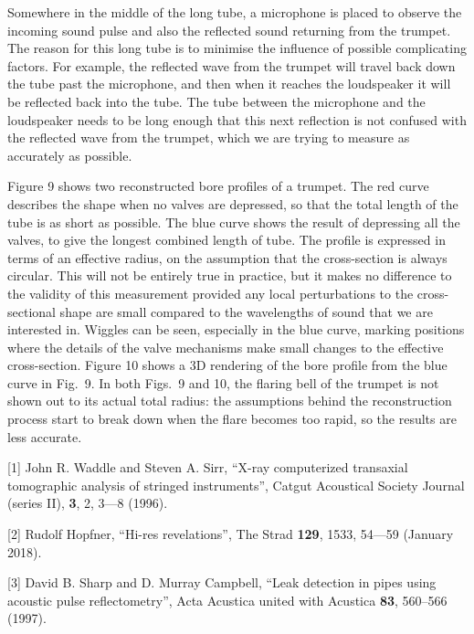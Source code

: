   Somewhere in the middle of the long tube, a microphone is placed to observe 
  the incoming sound pulse and also the reflected sound returning from the 
  trumpet. The reason for this long tube is to minimise the influence of 
  possible complicating factors. For example, the reflected wave from the 
  trumpet will travel back down the tube past the microphone, and then when it 
  reaches the loudspeaker it will be reflected back into the tube. The tube 
  between the microphone and the loudspeaker needs to be long enough that this 
  next reflection is not confused with the reflected wave from the trumpet, 
  which we are trying to measure as accurately as possible. 

  Figure 9 shows two reconstructed bore profiles of a trumpet. The red curve 
  describes the shape when no valves are depressed, so that the total length of 
  the tube is as short as possible. The blue curve shows the result of 
  depressing all the valves, to give the longest combined length of tube. The 
  profile is expressed in terms of an effective radius, on the assumption that 
  the cross-section is always circular. This will not be entirely true in 
  practice, but it makes no difference to the validity of this measurement 
  provided any local perturbations to the cross-sectional shape are small 
  compared to the wavelengths of sound that we are interested in. Wiggles can 
  be seen, especially in the blue curve, marking positions where the details of 
  the valve mechanisms make small changes to the effective cross-section. 
  Figure 10 shows a 3D rendering of the bore profile from the blue curve in 
  Fig.\ 9. In both Figs.\ 9 and 10, the flaring bell of the trumpet is not 
  shown out to its actual total radius: the assumptions behind the 
  reconstruction process start to break down when the flare becomes too rapid, 
  so the results are less accurate. 



  \sectionreferences{}[1] John R. Waddle and Steven A. Sirr, “X-ray 
  computerized transaxial tomographic analysis of stringed instruments”, Catgut 
  Acoustical Society Journal (series II), \textbf{3}, 2, 3—8 (1996). 

  [2] Rudolf Hopfner, “Hi-res revelations”, The Strad \textbf{129}, 1533, 54—59 
  (January 2018). 

  [3] David B. Sharp and D. Murray Campbell, “Leak detection in pipes using 
  acoustic pulse reflectometry”, Acta Acustica united with Acustica 
  \textbf{83}, 560–566 (1997). 